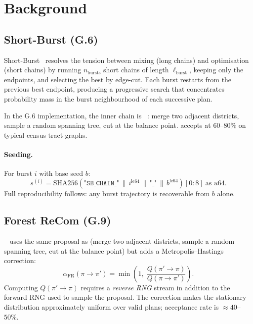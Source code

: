 \section{Background}
\label{sec:background}

\subsection{Short-Burst (G.6)}
\label{subsec:background-sb}

Short-Burst~\citep{cannon2022} resolves the tension between mixing (long chains)
and optimisation (short chains) by running $n_{\mathrm{bursts}}$ short chains of
length $\ell_{\mathrm{burst}}$, keeping only the endpoints, and selecting the
best by edge-cut.
Each burst restarts from the previous best endpoint, producing a progressive
search that concentrates probability mass in the burst neighbourhood of each
successive plan.

In the G.6 implementation, the inner chain is \recom{}~\citep{deford2021}:
merge two adjacent districts, sample a random spanning tree, cut at the
balance point.
\recom{} accepts at $60$--$80\%$ on typical census-tract graphs.

\paragraph{Seeding.}
For burst $i$ with base seed $b$:
\[
  s^{(i)} =
  \mathrm{SHA256}\!\left(\texttt{"SB\_CHAIN\_"} \,\|\, i^{\mathrm{le64}}
    \,\|\, \texttt{"\_"} \,\|\, b^{\mathrm{le64}}\right)[0{:}8]\;\text{as } u64.
\]
Full reproducibility follows: any burst trajectory is recoverable from $b$
alone.

\subsection{Forest ReCom (G.9)}
\label{subsec:background-frecom}

\frecom{}~\citep{mccartan2020,g9paper} uses the same proposal as \recom{}
(merge two adjacent districts, sample a random spanning tree, cut at the
balance point) but adds a Metropolis--Hastings correction:
\[
  \alpha_{\mathrm{FR}}(\pi \to \pi') =
  \min\!\left(1,\; \frac{Q(\pi' \to \pi)}{Q(\pi \to \pi')}\right).
\]
Computing $Q(\pi' \to \pi)$ requires a \emph{reverse RNG} stream in addition
to the forward RNG used to sample the proposal.
The correction makes the stationary distribution approximately uniform over
valid plans; acceptance rate is $\approx 40$--$50\%$.


